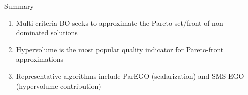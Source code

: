 \documentclass[main]{subfiles}
\begin{document}

\begin{frame}{Summary}
\begin{enumerate}
    \item Multi-criteria BO seeks to approximate the Pareto set/front of non-dominated solutions
    \item Hypervolume is the most popular quality indicator for Pareto-front approximations
    \item Representative algorithms include ParEGO (scalarization) and SMS-EGO (hypervolume contribution)
\end{enumerate}
\end{frame}
\end{document}
